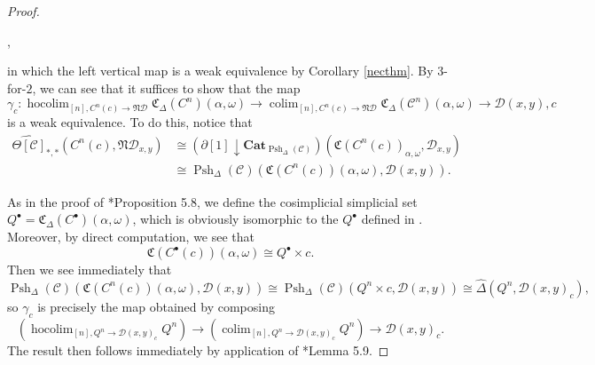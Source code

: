 \documentclass[leqno]{article}
\numberwithin{equation}{subsection}
\theoremstyle{plain}   %
\theoremstyle{remark}
\theoremstyle{plain}
\DeclareMathOperator*{\coliml}{colim}
\newcommand{\Cat}{\ensuremath{\mathbf{Cat}}}
\newcommand{\overcat}[2]{{\left(#1\downarrow #2\right)}}
\DeclareMathOperator*{\hocoliml}{hocolim}
\newcommand{\psh}[1]{\ensuremath{\widehat{#1}}}
\renewcommand{\C}{\ensuremath{\mathcal{C}}}
\newcommand{\cellset}{\ensuremath{\widehat{\Theta[\mathcal{C}]}}}
\newcommand{\spsh}{\ensuremath{\operatorname{Psh}_\Delta(\mathcal{C})}}
\begin{document}
\begin{proof}
	\begin{center}
		,
	\end{center}
	in which the left vertical map is a weak equivalence by Corollary \ref{necthm}. By \(3\)-for-\(2\), we can see that it suffices to show that the map
	\[\gamma_c: \hocoliml_{[n],C^n(c)\to \mathfrak{N}\mathcal{D}} \mathfrak{C}_\Delta(C^n)(\alpha,\omega) \to \coliml_{[n],C^n(c)\to \mathfrak{N}\mathcal{D}} \mathfrak{C}_\Delta(\C^n)(\alpha,\omega)\to \mathcal{D}(x,y),c\]
	is a weak equivalence.
	To do this, notice that
	\begin{align*}
		\cellset_{\ast,\ast}(C^n(c), \mathfrak{N}\mathcal{D}_{x,y}) & \cong \overcat{\partial[1]}{\Cat_{\spsh}}(\mathfrak{C}(C^n(c))_{\alpha,\omega},\mathcal{D}_{x,y}) \\
		& \cong \spsh(\mathfrak{C}(C^n(c))(\alpha,\omega), \mathcal{D}(x,y)).
	\end{align*}

	As in the proof of \cite{ds2}*{Proposition 5.8}, we define the cosimplicial simplicial set \(Q^\bullet = \mathfrak{C}_\Delta (C^\bullet)(\alpha,\omega)\), which is obviously isomorphic to the \(Q^\bullet\) defined in \cite{ds2}. Moreover, by direct computation, we see that
	\[\mathfrak{C}(C^\bullet(c))(\alpha,\omega)\cong Q^\bullet \times c.\]
	Then we see immediately that
	\[\spsh(\mathfrak{C}(C^n(c))(\alpha,\omega), \mathcal{D}(x,y)) \cong \spsh(Q^n \times c, \mathcal{D}(x,y))\cong \psh{\Delta}(Q^n, \mathcal{D}(x,y)_c),\]
	so \(\gamma_c\) is precisely the map obtained by composing
	\[\left(\hocoliml_{[n],Q^n\to \mathcal{D}(x,y)_c} Q^n\right) \to \left(\coliml_{[n],Q^n\to \mathcal{D}(x,y)_c} Q^n\right) \to \mathcal{D}(x,y)_c.\]
	The result then follows immediately by application of \cite{ds2}*{Lemma 5.9}.
\end{proof}
\end{document}
